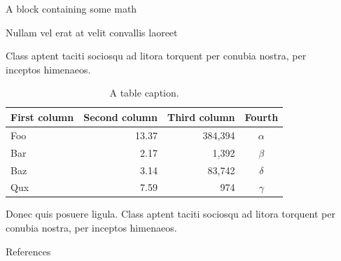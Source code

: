 \documentclass[final]{beamer}
\newlength{\sepwidth}
\newlength{\colwidth}
\newcommand{\separatorcolumn}{\begin{column}{\sepwidth}\end{column}}
\begin{document}
\begin{frame}[t]
\begin{columns}[t]
\begin{column}{\colwidth}
\begin{block}{A block containing some math}
  \end{block}

  \begin{block}{Nullam vel erat at velit convallis laoreet}

    Class aptent taciti sociosqu ad litora torquent per conubia nostra, per
    inceptos himenaeos. 

    \begin{table}
      \centering
      \begin{tabular}{l r r c}
        \toprule
        \textbf{First column} & \textbf{Second column} & \textbf{Third column} & \textbf{Fourth} \\
        \midrule
        Foo & 13.37 & 384,394 & $\alpha$ \\
        Bar & 2.17 & 1,392 & $\beta$ \\
        Baz & 3.14 & 83,742 & $\delta$ \\
        Qux & 7.59 & 974 & $\gamma$ \\
        \bottomrule
      \end{tabular}
      \caption{A table caption.}
    \end{table}

    Donec quis posuere ligula. Class aptent taciti sociosqu
    ad litora torquent per conubia nostra, per inceptos himenaeos.

  \end{block}

  \begin{block}{References}

 \footnotesize{\printbibliography}
 
  \end{block}

\end{column}

\separatorcolumn
\end{columns}
\end{frame}
\end{document}
